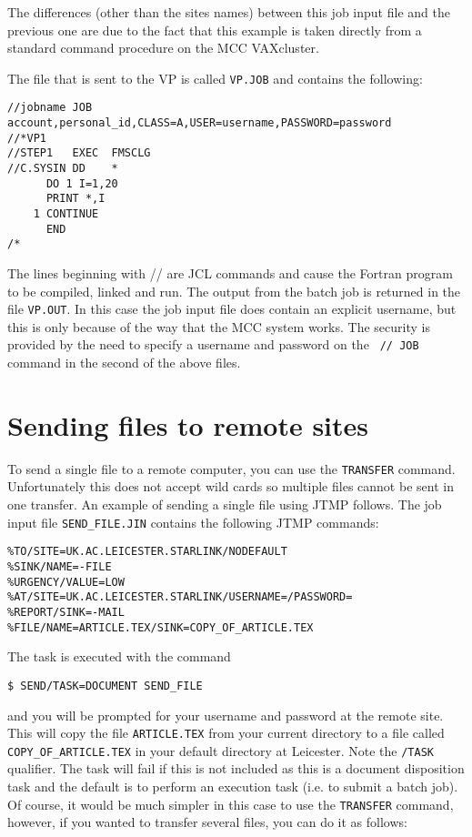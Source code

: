 The differences (other than the sites names) between this job input file and
the previous one are due to the fact that this example is taken directly from a
standard command procedure on the MCC VAXcluster.

The file that is sent to the VP is called {\tt VP.JOB} and contains the
following:

\begin{verbatim}
//jobname JOB account,personal_id,CLASS=A,USER=username,PASSWORD=password
//*VP1
//STEP1   EXEC  FMSCLG
//C.SYSIN DD    *
      DO 1 I=1,20
      PRINT *,I
    1 CONTINUE
      END
/*
\end{verbatim}

The lines beginning with // are JCL commands and cause the Fortran program to be
compiled, linked and run. The output from the batch job is returned in the file
{\tt VP.OUT}. In this case the job input file does contain an explicit
username, but this is only because of the way that the MCC system works. The
security is provided by the need to specify a username and password on the {\tt
//~JOB} command in the second of the above files.

\section{Sending files to remote sites}

To send a single file to a remote computer, you can use the {\tt TRANSFER}
command. Unfortunately this does not accept wild cards so multiple files
cannot be sent in one transfer. An example of sending a single file using 
JTMP follows.
The job input file {\tt SEND\_FILE.JIN} contains the following JTMP commands:

\begin{verbatim}
%TO/SITE=UK.AC.LEICESTER.STARLINK/NODEFAULT
%SINK/NAME=-FILE
%URGENCY/VALUE=LOW
%AT/SITE=UK.AC.LEICESTER.STARLINK/USERNAME=/PASSWORD=
%REPORT/SINK=-MAIL
%FILE/NAME=ARTICLE.TEX/SINK=COPY_OF_ARTICLE.TEX
\end{verbatim}

The task is executed with the command

\begin{verbatim}
$ SEND/TASK=DOCUMENT SEND_FILE
\end{verbatim}

and you will be prompted for your username and password at the remote site. This
will copy the file {\tt ARTICLE.TEX} from your current directory to a file
called {\tt COPY\_OF\_ARTICLE.TEX} in your default directory at Leicester. Note
the {\tt /TASK} qualifier. The task will fail if this is not included as this
is a document disposition task and the default is to perform an execution task
(i.e. to submit a batch job). Of course, it would be much simpler in this case
to use the {\tt TRANSFER} command, however, if you wanted to transfer several
files, you can do it as follows:

